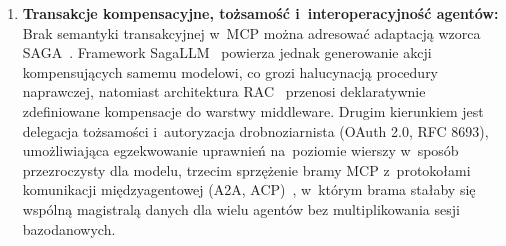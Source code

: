 \begin{enumerate}
    \item \textbf{Transakcje kompensacyjne, tożsamość i~interoperacyjność agentów:}
    Brak semantyki transakcyjnej w~MCP można adresować adaptacją wzorca SAGA~\cite{garcia1987sagas}. Framework SagaLLM~\cite{chang2025sagallm} powierza jednak generowanie akcji kompensujących samemu modelowi, co grozi halucynacją procedury naprawczej, natomiast architektura RAC~\cite{perera2026rac} przenosi deklaratywnie zdefiniowane kompensacje do warstwy middleware. Drugim kierunkiem jest delegacja tożsamości i~autoryzacja drobnoziarnista (OAuth 2.0, RFC 8693), umożliwiająca egzekwowanie uprawnień na~poziomie wierszy w~sposób przezroczysty dla modelu, trzecim sprzężenie bramy MCP z~protokołami komunikacji międzyagentowej (A2A, ACP)~\cite{survey_agent_interoperability_2025}, w~którym brama stałaby się wspólną magistralą danych dla wielu agentów bez multiplikowania sesji bazodanowych.
\end{enumerate}
